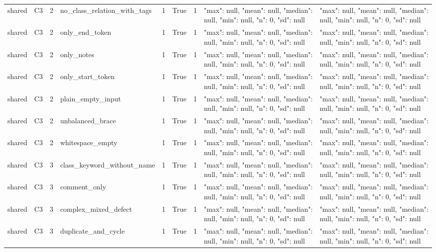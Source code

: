 \begin{tabular}{lllllllll}
shared & C3 & 2 & no\_class\_relation\_with\_tags & 1 & True & 1 & {"max": null, "mean": null, "median": null, "min": null, "n": 0, "sd": null} & {"max": null, "mean": null, "median": null, "min": null, "n": 0, "sd": null} \\
shared & C3 & 2 & only\_end\_token & 1 & True & 1 & {"max": null, "mean": null, "median": null, "min": null, "n": 0, "sd": null} & {"max": null, "mean": null, "median": null, "min": null, "n": 0, "sd": null} \\
shared & C3 & 2 & only\_notes & 1 & True & 1 & {"max": null, "mean": null, "median": null, "min": null, "n": 0, "sd": null} & {"max": null, "mean": null, "median": null, "min": null, "n": 0, "sd": null} \\
shared & C3 & 2 & only\_start\_token & 1 & True & 1 & {"max": null, "mean": null, "median": null, "min": null, "n": 0, "sd": null} & {"max": null, "mean": null, "median": null, "min": null, "n": 0, "sd": null} \\
shared & C3 & 2 & plain\_empty\_input & 1 & True & 1 & {"max": null, "mean": null, "median": null, "min": null, "n": 0, "sd": null} & {"max": null, "mean": null, "median": null, "min": null, "n": 0, "sd": null} \\
shared & C3 & 2 & unbalanced\_brace & 1 & True & 1 & {"max": null, "mean": null, "median": null, "min": null, "n": 0, "sd": null} & {"max": null, "mean": null, "median": null, "min": null, "n": 0, "sd": null} \\
shared & C3 & 2 & whitespace\_empty & 1 & True & 1 & {"max": null, "mean": null, "median": null, "min": null, "n": 0, "sd": null} & {"max": null, "mean": null, "median": null, "min": null, "n": 0, "sd": null} \\
shared & C3 & 3 & class\_keyword\_without\_name & 1 & True & 1 & {"max": null, "mean": null, "median": null, "min": null, "n": 0, "sd": null} & {"max": null, "mean": null, "median": null, "min": null, "n": 0, "sd": null} \\
shared & C3 & 3 & comment\_only & 1 & True & 1 & {"max": null, "mean": null, "median": null, "min": null, "n": 0, "sd": null} & {"max": null, "mean": null, "median": null, "min": null, "n": 0, "sd": null} \\
shared & C3 & 3 & complex\_mixed\_defect & 1 & True & 1 & {"max": null, "mean": null, "median": null, "min": null, "n": 0, "sd": null} & {"max": null, "mean": null, "median": null, "min": null, "n": 0, "sd": null} \\
shared & C3 & 3 & duplicate\_and\_cycle & 1 & True & 1 & {"max": null, "mean": null, "median": null, "min": null, "n": 0, "sd": null} & {"max": null, "mean": null, "median": null, "min": null, "n": 0, "sd": null} \\

\end{tabular}
